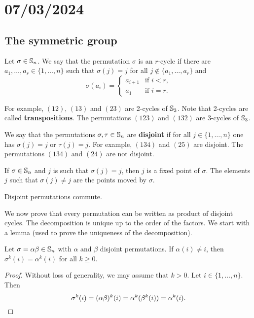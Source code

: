 \section{07/03/2024}

\subsection{The symmetric group}

Let $\sigma\in\mathbb{S}_n$. We say that the permutation $\sigma$ is an $r$-cycle 
if there are $a_1,\dots,a_r\in\{1,\dots,n\}$ such that 
$\sigma(j)=j$ for all $j\not\in\{a_1,\dots,a_r\}$ and 
\[
\sigma(a_i)=\begin{cases}
a_{i+1} & \text{if $i<r$},\\
a_1 & \text{if $i=r$}.
\end{cases}
\]

For example, $(12)$, $(13)$ and $(23)$ are 2-cycles of 
$\mathbb{S}_3$. Note that 
2-cycles are called \textbf{transpositions}.
The permutations $(123)$ and $(132)$ are 3-cycles of $\mathbb{S}_3$.

We say that the permutations $\sigma,\tau\in\mathbb{S}_n$ 
are \textbf{disjoint} if for all 
$j\in\{1,\dots,n\}$
one has $\sigma(j)=j$ or $\tau(j)=j$. For example, 
$(134)$ and $(25)$ are disjoint. The permutations $(134)$ and 
$(24)$ are not disjoint. 

If $\sigma\in\mathbb{S}_n$ and $j$ is such that 
$\sigma(j)=j$, then $j$ is a fixed point of $\sigma$. The elements 
$j$ such that 
$\sigma(j)\ne j$ are the points moved by 
$\sigma$.

\begin{claim}
Disjoint permutations commute. 
\end{claim}


We now prove that every permutation can be written 
as product of disjoint cycles. 
The decomposition is unique up to the order of the factors. 
We start with a lemma (used to prove the uniqueness of the decomposition).

\begin{lemma}
        Let $\sigma=\alpha\beta\in\mathbb{S}_n$ with $\alpha$ and $\beta$ disjoint permutations. If $\alpha(
i)\ne i$, then $\sigma^k(i)=\alpha^k(i)$ for all $k\geq0$.
\end{lemma}

\begin{proof}
    Without loss of generality, we may assume that $k>0$. 
    Let $i\in\{1,\dots,n\}$. Then \[
    \sigma^k(i)=(\alpha\beta)^k(i)=\alpha^k(\beta^k(i))=\alpha^k(i).\qedhere
    \]
\end{proof}

